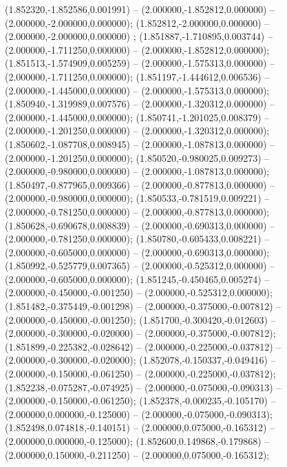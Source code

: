  (1.852320,-1.852586,0.001991) -- (2.000000,-1.852812,0.000000) -- (2.000000,-2.000000,0.000000);
 (1.852812,-2.000000,0.000000) -- (2.000000,-2.000000,0.000000) ;
 (1.851887,-1.710895,0.003744) -- (2.000000,-1.711250,0.000000) -- (2.000000,-1.852812,0.000000);
 (1.851513,-1.574909,0.005259) -- (2.000000,-1.575313,0.000000) -- (2.000000,-1.711250,0.000000);
 (1.851197,-1.444612,0.006536) -- (2.000000,-1.445000,0.000000) -- (2.000000,-1.575313,0.000000);
 (1.850940,-1.319989,0.007576) -- (2.000000,-1.320312,0.000000) -- (2.000000,-1.445000,0.000000);
 (1.850741,-1.201025,0.008379) -- (2.000000,-1.201250,0.000000) -- (2.000000,-1.320312,0.000000);
 (1.850602,-1.087708,0.008945) -- (2.000000,-1.087813,0.000000) -- (2.000000,-1.201250,0.000000);
 (1.850520,-0.980025,0.009273) -- (2.000000,-0.980000,0.000000) -- (2.000000,-1.087813,0.000000);
 (1.850497,-0.877965,0.009366) -- (2.000000,-0.877813,0.000000) -- (2.000000,-0.980000,0.000000);
 (1.850533,-0.781519,0.009221) -- (2.000000,-0.781250,0.000000) -- (2.000000,-0.877813,0.000000);
 (1.850628,-0.690678,0.008839) -- (2.000000,-0.690313,0.000000) -- (2.000000,-0.781250,0.000000);
 (1.850780,-0.605433,0.008221) -- (2.000000,-0.605000,0.000000) -- (2.000000,-0.690313,0.000000);
 (1.850992,-0.525779,0.007365) -- (2.000000,-0.525312,0.000000) -- (2.000000,-0.605000,0.000000);
 (1.851245,-0.450465,0.005274) -- (2.000000,-0.450000,-0.001250) -- (2.000000,-0.525312,0.000000);
 (1.851482,-0.375449,-0.001298) -- (2.000000,-0.375000,-0.007812) -- (2.000000,-0.450000,-0.001250);
 (1.851700,-0.300420,-0.012603) -- (2.000000,-0.300000,-0.020000) -- (2.000000,-0.375000,-0.007812);
 (1.851899,-0.225382,-0.028642) -- (2.000000,-0.225000,-0.037812) -- (2.000000,-0.300000,-0.020000);
 (1.852078,-0.150337,-0.049416) -- (2.000000,-0.150000,-0.061250) -- (2.000000,-0.225000,-0.037812);
 (1.852238,-0.075287,-0.074925) -- (2.000000,-0.075000,-0.090313) -- (2.000000,-0.150000,-0.061250);
 (1.852378,-0.000235,-0.105170) -- (2.000000,0.000000,-0.125000) -- (2.000000,-0.075000,-0.090313);
 (1.852498,0.074818,-0.140151) -- (2.000000,0.075000,-0.165312) -- (2.000000,0.000000,-0.125000);
 (1.852600,0.149868,-0.179868) -- (2.000000,0.150000,-0.211250) -- (2.000000,0.075000,-0.165312);
